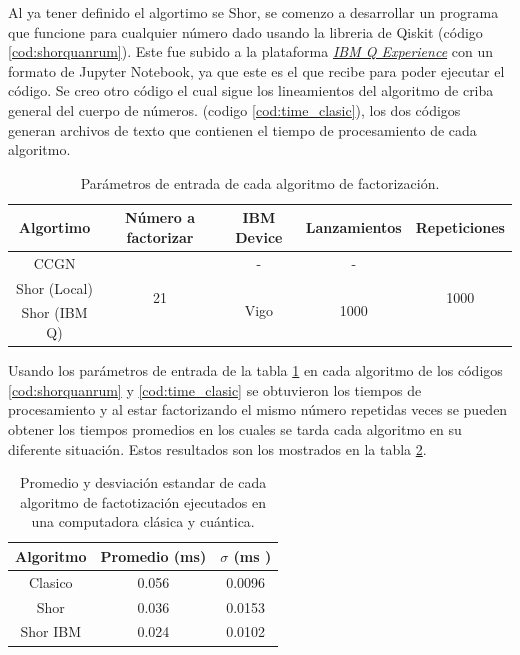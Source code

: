 Al ya tener definido el algortimo se Shor, se comenzo a desarrollar un programa que funcione para cualquier número dado usando la libreria
de Qiskit (código \ref{cod:shorquanrum}). Este fue subido a la plataforma \href{https://quantum-computing.ibm.com/}{\textit{IBM Q Experience}} con un formato de 
Jupyter Notebook, ya que este es el que recibe para poder ejecutar el código. Se creo otro código el cual sigue los lineamientos del algoritmo de criba general del cuerpo de números.
(codigo \ref{cod:time_clasic}), los dos códigos generan archivos de texto que contienen el tiempo de procesamiento de cada algoritmo.
\begin{table}[H]
    \centering
    \begin{tabular}{|c|c|c|c|c|} \hline
        Algortimo & Número a factorizar & IBM Device & Lanzamientos & Repeticiones \\ \hline 
        CCGN & \multirow{3}{*}{21} & - & -& \multirow{3}{*}{1000}\\  \cline{1-1} \cline{3-4}
        Shor (Local) &  & \multirow{2}{*}{Vigo}& \multirow{2}{*}{1000}& \\ \cline{1-1}
        Shor (IBM Q) &  & &  &\\\hline
    \end{tabular}
    \caption{Parámetros de entrada de cada algoritmo de factorización.}
    \label{table:parametros}
\end{table}
Usando los parámetros de entrada de la tabla \ref{table:parametros} en cada algoritmo de los códigos \ref{cod:shorquanrum} y \ref{cod:time_clasic} se obtuvieron los tiempos de procesamiento y al estar
factorizando el mismo número repetidas veces se pueden obtener los tiempos promedios en los cuales se tarda cada algoritmo en su diferente situación. Estos resultados son los mostrados en la tabla \ref{tabla:resultados}.
\begin{table}[H]
    \centering
    \begin{tabular}{ccc} \hline
        Algoritmo & Promedio (ms) & $\sigma$ (ms ) \\ \hline
        Clasico & 0.056 & 0.0096 \\
        Shor &0.036& 0.0153 \\
        Shor IBM &0.024 &0.0102 \\ \hline
    \end{tabular}
    \caption{Promedio y desviación estandar de cada algoritmo de factotización ejecutados en una computadora clásica y cuántica.}
    \label{tabla:resultados}
\end{table}
